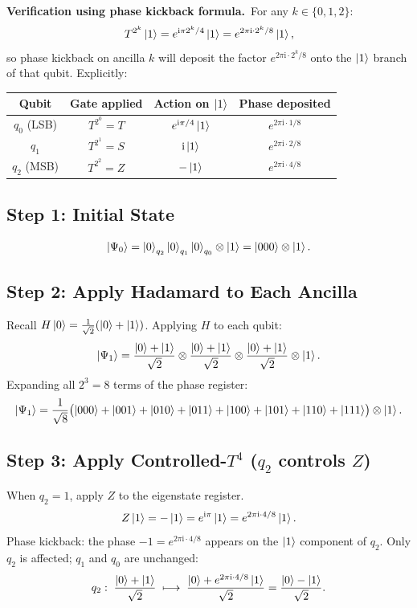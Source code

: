 \documentclass[12pt,a4paper]{article}
\newcommand{\ii}{\mathrm{i}}
\begin{document}
\medskip
\noindent\textbf{Verification using phase kickback formula.}\ For any $k \in \{0,1,2\}$:
\[
  T^{2^k}\Ket{1}
  = e^{\ii\pi 2^k/4}\Ket{1}
  = e^{2\pi \ii \cdot 2^k/8}\Ket{1},
\]
so phase kickback on ancilla $k$ will deposit the factor $e^{2\pi\ii\cdot 2^k/8}$
onto the $\Ket{1}$ branch of that qubit.  Explicitly:
\begin{center}
\begin{tabular}{@{}cccc@{}}
\toprule
Qubit & Gate applied & Action on $\Ket{1}$ & Phase deposited \\
\midrule
$q_0$ (LSB) & $T^{2^0}=T$ & $e^{\ii\pi/4}\Ket{1}$ & $e^{2\pi\ii\cdot 1/8}$ \\
$q_1$       & $T^{2^1}=S$ & $\ii\Ket{1}$ & $e^{2\pi\ii\cdot 2/8}$ \\
$q_2$ (MSB) & $T^{2^2}=Z$ & $-\Ket{1}$ & $e^{2\pi\ii\cdot 4/8}$ \\
\bottomrule
\end{tabular}
\end{center}

\subsection{Step 1: Initial State}

\[
  \Ket{\Psi_0} = \Ket{0}_{q_2}\Ket{0}_{q_1}\Ket{0}_{q_0}\otimes\Ket{1}
  = \Ket{000}\otimes\Ket{1}.
\]

\subsection{Step 2: Apply Hadamard to Each Ancilla}

Recall $H\Ket{0} = \frac{1}{\sqrt{2}}(\Ket{0}+\Ket{1})$.  Applying $H$ to each qubit:
\[
  \Ket{\Psi_1}
  = \frac{\Ket{0}+\Ket{1}}{\sqrt{2}}\otimes
    \frac{\Ket{0}+\Ket{1}}{\sqrt{2}}\otimes
    \frac{\Ket{0}+\Ket{1}}{\sqrt{2}}\otimes\Ket{1}.
\]
Expanding all $2^3 = 8$ terms of the phase register:
\[
  \Ket{\Psi_1}
  = \frac{1}{\sqrt{8}}\bigl(
    \Ket{000}+\Ket{001}+\Ket{010}+\Ket{011}
    +\Ket{100}+\Ket{101}+\Ket{110}+\Ket{111}
  \bigr)\otimes\Ket{1}.
\]

\subsection{Step 3: Apply Controlled-\texorpdfstring{$T^4$}{T\^{}4} (\texorpdfstring{$q_2$}{q2} controls \texorpdfstring{$Z$}{Z})}

When $q_2 = 1$, apply $Z$ to the eigenstate register.
\[
  Z\Ket{1} = -\Ket{1} = e^{\ii\pi}\Ket{1} = e^{2\pi\ii\cdot 4/8}\Ket{1}.
\]
Phase kickback: the phase $-1 = e^{2\pi\ii\cdot 4/8}$ appears on the $\Ket{1}$
component of $q_2$.  Only $q_2$ is affected; $q_1$ and $q_0$ are unchanged:
\[
  q_2:\;\frac{\Ket{0}+\Ket{1}}{\sqrt{2}}
  \;\longmapsto\;
  \frac{\Ket{0}+e^{2\pi\ii\cdot 4/8}\Ket{1}}{\sqrt{2}}
  = \frac{\Ket{0}-\Ket{1}}{\sqrt{2}}.
\]
\end{document}
